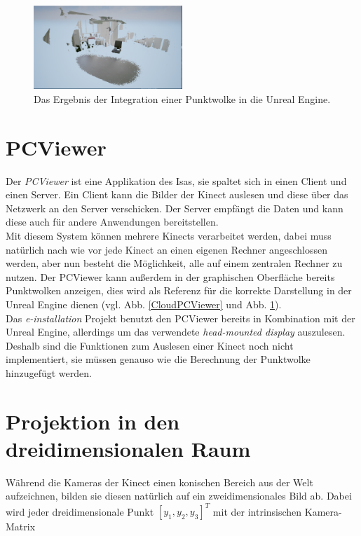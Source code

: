 \documentclass[a4paper]{IEEEtran}
\begin{document}
		\begin{figure}[!h]
    	\centering
		\includegraphics[width=0.5\textwidth]{img/Cloud}
	    \caption{Das Ergebnis der Integration einer Punktwolke in die Unreal Engine.}
    	\label{Cloud}
	\end{figure} 

\section{PCViewer}
	Der {\textit{PCViewer}} ist eine Applikation des Isas, sie spaltet sich in einen Client und einen Server. 
	Ein Client kann die Bilder der Kinect auslesen und diese über das Netzwerk an den Server verschicken. 
	Der Server empfängt die Daten und kann diese auch für andere Anwendungen bereitstellen.\\
	Mit diesem System können mehrere Kinects verarbeitet werden, dabei muss natürlich nach wie vor jede Kinect an einen eigenen Rechner angeschlossen werden, aber nun besteht die Möglichkeit, alle auf einem zentralen Rechner zu nutzen.
	Der PCViewer kann außerdem in der graphischen Oberfläche bereits Punktwolken anzeigen, dies wird als Referenz für die korrekte Darstellung in der Unreal Engine dienen (vgl. Abb. \ref{CloudPCViewer} und Abb. \ref{Cloud}). \\
	Das {\textit{e-installation}} Projekt benutzt den PCViewer bereits in Kombination mit der Unreal Engine, allerdings um das verwendete {\textit{head-mounted display}} auszulesen. 
	Deshalb sind die Funktionen zum Auslesen einer Kinect noch nicht implementiert, sie müssen genauso wie die Berechnung der Punktwolke hinzugefügt werden. \\[0.5cm]
	



\section{Projektion in den dreidimensionalen Raum}
	Während die Kameras der Kinect einen konischen Bereich aus der Welt aufzeichnen, bilden sie diesen natürlich auf ein zweidimensionales Bild ab. 
	Dabei wird jeder dreidimensionale Punkt $[y_1,y_2,y_3]^T$ mit der intrinsischen Kamera-Matrix \\ [1cm]
\end{document}
